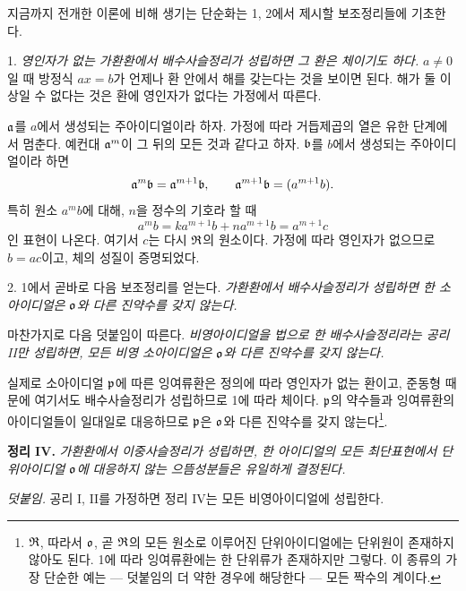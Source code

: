 지금까지 전개한 이론에 비해 생기는 단순화는 1, 2에서 제시할 보조정리들에 기초한다.

1. \emph{영인자가 없는 가환환에서 배수사슬정리가 성립하면 그 환은 체이기도 하다.} \(a\ne0\)일 때 방정식 \(ax=b\)가 언제나 환 안에서 해를 갖는다는 것을 보이면 된다. 해가 둘 이상일 수 없다는 것은 환에 영인자가 없다는 가정에서 따른다.

\(\mathfrak{a}\)를 \(a\)에서 생성되는 주아이디얼이라 하자. 가정에 따라 거듭제곱의 열은 유한 단계에서 멈춘다. 예컨대 \(\mathfrak{a}^m\)이 그 뒤의 모든 것과 같다고 하자. \(\mathfrak{b}\)를 \(b\)에서 생성되는 주아이디얼이라 하면
\[
\mathfrak{a}^m\mathfrak{b}=\mathfrak{a}^{m+1}\mathfrak{b},
\qquad
\mathfrak{a}^{m+1}\mathfrak{b}=(a^{m+1}b).
\]
특히 원소 \(a^m b\)에 대해, \(n\)을 정수의 기호라 할 때
\[
        a^m b=k a^{m+1}b+n a^{m+1}b=a^{m+1}c
\]
인 표현이 나온다. 여기서 \(c\)는 다시 \(\mathfrak{R}\)의 원소이다. 가정에 따라 영인자가 없으므로 \(b=ac\)이고, 체의 성질이 증명되었다.

2. 1에서 곧바로 다음 보조정리를 얻는다. \emph{가환환에서 배수사슬정리가 성립하면 한 소아이디얼은 \(\mathfrak{o}\)와 다른 진약수를 갖지 않는다.}

마찬가지로 다음 덧붙임이 따른다. \emph{비영아이디얼을 법으로 한 배수사슬정리라는 공리 II만 성립하면, 모든 비영 소아이디얼은 \(\mathfrak{o}\)와 다른 진약수를 갖지 않는다.}

실제로 소아이디얼 \(\mathfrak{p}\)에 따른 잉여류환은 정의에 따라 영인자가 없는 환이고, 준동형 때문에 여기서도 배수사슬정리가 성립하므로 1에 따라 체이다. \(\mathfrak{p}\)의 약수들과 잉여류환의 아이디얼들이 일대일로 대응하므로 \(\mathfrak{p}\)은 \(\mathfrak{o}\)와 다른 진약수를 갖지 않는다\footnote{\(\mathfrak{R}\), 따라서 \(\mathfrak{o}\), 곧 \(\mathfrak{R}\)의 모든 원소로 이루어진 단위아이디얼에는 단위원이 존재하지 않아도 된다. 1에 따라 잉여류환에는 한 단위류가 존재하지만 그렇다. 이 종류의 가장 단순한 예는 --- 덧붙임의 더 약한 경우에 해당한다 --- 모든 짝수의 계이다.}.

\textbf{정리 IV.} \emph{가환환에서 이중사슬정리가 성립하면, 한 아이디얼의 모든 최단표현에서 단위아이디얼 \(\mathfrak{o}\)에 대응하지 않는 으뜸성분들은 유일하게 결정된다.}

\emph{덧붙임.} 공리 I, II를 가정하면 정리 IV는 모든 비영아이디얼에 성립한다.

